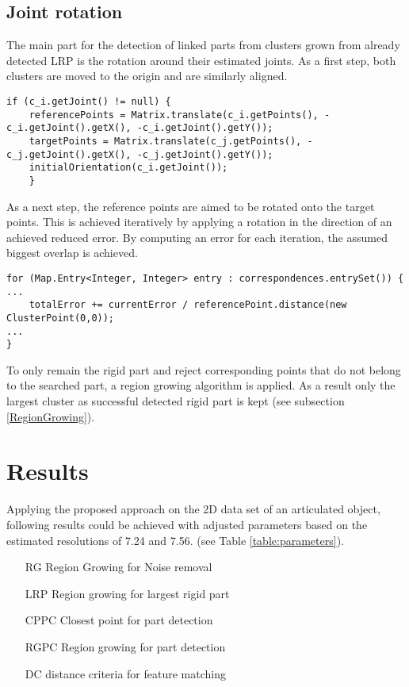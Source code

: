 \subsection{Joint rotation}
The main part for the detection of linked parts from clusters grown from already detected LRP is the rotation around their estimated joints. As a first step, both clusters are moved to the origin and are similarly aligned.
\begin{lstlisting}
if (c_i.getJoint() != null) {
	referencePoints = Matrix.translate(c_i.getPoints(), -c_i.getJoint().getX(), -c_i.getJoint().getY());
	targetPoints = Matrix.translate(c_j.getPoints(), -c_j.getJoint().getX(), -c_j.getJoint().getY());
	initialOrientation(c_i.getJoint());
	}
\end{lstlisting}
As a next step, the reference points are aimed to be rotated onto the target points. This is achieved iteratively by applying a rotation in the direction of an achieved reduced error. By computing an error for each iteration, the assumed biggest overlap is achieved.
\begin{lstlisting}
for (Map.Entry<Integer, Integer> entry : correspondences.entrySet()) {
...
	totalError += currentError / referencePoint.distance(new ClusterPoint(0,0));	
...	
}
\end{lstlisting}
To only remain the rigid part and reject corresponding points that do not belong to the searched part, a region growing algorithm is applied. As a result only the largest cluster as successful detected rigid part is kept (see subsection \ref{RegionGrowing}).

\section{Results}
\label{ResultsLRP}

Applying the proposed approach on the 2D data set of an articulated object, following results could be achieved with adjusted parameters based on the estimated resolutions of 7.24 and 7.56. (see Table \ref{table:parameters}).

\begin{itemize}
	\item[RG] Region Growing for Noise removal
	\item[LRP] Region growing for largest rigid part
	\item[CPPC] Closest point for part detection 
	\item[RGPC]	Region growing for part detection
	\item[DC] distance criteria for feature matching
\end{itemize}

